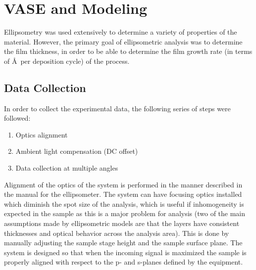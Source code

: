 
\section{VASE and Modeling}
\label{sec:Methods-Ellip}

Ellipsometry was used extensively to determine a variety of properties of the material. However, the primary goal of ellipsometric analysis was to determine the film thickness, in order to be able to determine the film growth rate (in terms of \AA\ per deposition cycle) of the process. 


\subsection{Data Collection}

In order to collect the experimental data, the following series of steps were followed:

\begin{enumerate}
	\item
	Optics alignment
	\item
	Ambient light compensation (DC offset)
	\item
	Data collection at multiple angles
\end{enumerate}

Alignment of the optics of the system is performed in the manner described in the manual for the ellipsometer.\cite{WVASE-manual} The system can have focusing optics installed which diminish the spot size of the analysis, which is useful if inhomogeneity is expected in the sample as this is a major problem for analysis (two of the main assumptions made by ellipsometric models are that the layers have consistent thicknesses and optical behavior across the analysis area). This is done by manually adjusting the sample stage height and the sample surface plane. The system is designed so that when the incoming signal is maximized the sample is properly aligned with respect to the p- and s-planes defined by the equipment.\cite{Bruzzese_2010}

